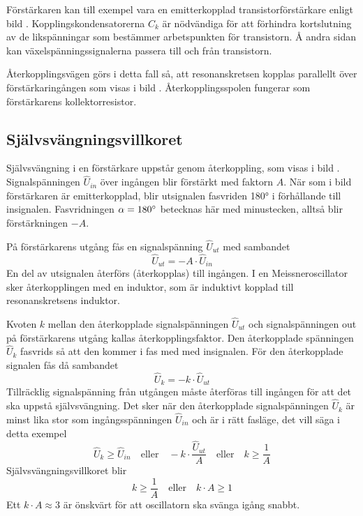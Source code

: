 Förstärkaren kan till exempel vara en emitterkopplad transistorförstärkare enligt bild
.
Kopplingskondensatorerna \(C_k\) är nödvändiga för att förhindra kortslutning
av de likspänningar som bestämmer arbetspunkten för transistorn.
Å andra sidan kan växelspänningssignalerna passera till och från transistorn.

Återkopplingsvägen görs i detta fall så, att resonanskretsen kopplas
parallellt över förstärkaringången som visas i bild .
Återkopplingsspolen fungerar som förstärkarens kollektorresistor.

\subsection{Självsvängningsvillkoret}


Självsvängning i en förstärkare uppstår genom återkoppling, som visas i
bild .
Signalspänningen \(\hat{U}_{in}\) över ingången blir förstärkt med
faktorn \(A\).
När som i bild  förstärkaren är emitterkopplad, blir
utsignalen fasvriden \ang{180} i förhållande till insignalen.
Fasvridningen \(\alpha=180\degree\) betecknas här med minustecken, alltså blir
förstärkningen \(-A\).

På förstärkarens utgång fås en signalspänning \(\hat{U}_{ut}\) med sambandet
%
\[\hat{U}_{ut} = -A \cdot \hat{U}_{in}\]
%
En del av utsignalen återförs (återkopplas) till ingången.
I en Meissneroscillator sker återkopplingen med en induktor, som är
induktivt kopplad till resonanskretsens induktor.

Kvoten \(k\) mellan den återkopplade signalspänningen \(\hat{U}_{ut}\) och
signalspänningen out på förstärkarens utgång kallas återkopplingsfaktor.
Den återkopplade spänningen \(\hat{U}_k\) fasvrids så att den kommer
i fas med med insignalen.
För den återkopplade signalen fås då sambandet
%
\[\hat{U}_k = -k \cdot \hat{U}_{ut}\]
%
Tillräcklig signalspänning från utgången måste återföras till ingången
för att det ska uppstå självsvängning.
Det sker när den återkopplade signalspänningen \(\hat{U}_k\) är minst lika stor
som ingångsspänningen \(\hat{U}_{in}\) och är i rätt fasläge, det vill säga i
detta exempel
%
\[
\hat{U}_k \geq \hat{U}_{in}
\quad \text{eller} \quad
-k \cdot \frac{\hat{U}_{ut}}{A}
\quad \text{eller} \quad
k \geq \frac{1}{A}
\]
%
Självsvängningsvillkoret blir
%
\[
k \geq \frac{1}{A}
\quad \text{eller} \quad
k \cdot A \geq 1
\]
%
Ett \(k \cdot A \approx 3\) är önskvärt för att oscillatorn ska svänga igång
snabbt.


